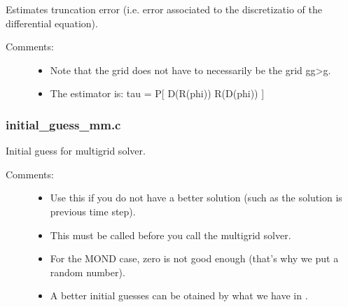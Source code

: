 \documentclass[letterpaper,10pt,english]{sphinxmanual}
\begin{document}
\begin{fulllineitems}
\label{\detokenize{sphinx-c-apidoc/output/gravity/mond_mass/gs_residual_truncation_error_mm_c:c.trunc_err_mm}}%
\pysigstartmultiline
{}%
\pysigstopmultiline
Estimates truncation error (i.e. error associated to the discretizatio of the differential equation).
\begin{description}
\item[{Comments:}] \leavevmode\begin{itemize}
\item {} 
Note that the grid does not have to necessarily be the grid gg\sphinxhyphen{}\textgreater{}g.

\item {} 
The estimator is: tau = P{[} D(R(phi)) \sphinxhyphen{} R(D(phi)) {]}

\end{itemize}

\end{description}

\end{fulllineitems}



\subsubsection{initial\_guess\_mm.c}
\label{\detokenize{sphinx-c-apidoc/output/gravity/mond_mass/initial_guess_mm_c:initial-guess-mm-c}}\label{\detokenize{sphinx-c-apidoc/output/gravity/mond_mass/initial_guess_mm_c::doc}}
Initial guess for multigrid solver.
\begin{description}
\item[{Comments:}] \leavevmode\begin{itemize}
\item {} 
Use this if you do not have a better solution (such as the solution
is previous time step).

\item {} 
This must be called before you call the multigrid solver.

\item {} 
For the MOND case, zero is not good enough (that’s why we put a
random number).

\item {} 
A better initial guesses can be otained by what we have in .

\end{itemize}

\end{description}
\end{document}
